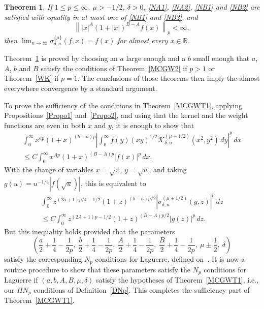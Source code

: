 \documentclass{amsart}
\theoremstyle{plain}
\newtheorem{Theo}{Theorem}
\theoremstyle{definition}
\theoremstyle{remark}
\newcommand{\chem}[3]{\sigma_{#1,#2}^{\{#3\}}} %
\newcommand{\claker}[5]{\mathcal{K}_{#1,#2}^{(#3)}%
  (#4,#5)} %
\newcommand{\clam}[3]{\sigma_{#1,#2}^{(#3)}} %
\newcommand{\I}{\infty}
\begin{document}
\begin{Theo}
\label{CAE} If $1\le p\le\infty$, $\mu>-1/2$, $\delta>0$, \eqref{NA1}, \eqref{NA2}, \eqref{NB1}
and \eqref{NB2} are satisfied with equality in at most one of \eqref{NB1} and \eqref{NB2}, and
\[
  \left\| |x|^A(1+|x|)^{B-A}f(x)\right\|_p < \infty,
\]
then
$\displaystyle{\lim_{n\to\infty}\chem{\delta}{n}{\mu}(f,x)=f(x)}$
for almost every $x \in \mathbb{R}$.
\end{Theo}

Theorem~\ref{CAE} is proved by choosing an $a$ large enough and a $b$ small enough that $a$, $A$,
$b$ and $B$ satisfy the conditions of Theorem~\ref{MCGW2} if $p>1$ or Theorem~\ref{WK} if $p=1$.
The conclusions of those theorems then imply the almost everywhere convergence by a standard
argument.

To prove the sufficiency of the conditions in Theorem~\ref{MCGWT1}, applying
Propositions~\ref{Propo1} and~\ref{Propo2}, and using that the kernel and the weight
functions are even in both $x$ and $y$, it is enough to show that
\begin{multline*}
  \int_0^\I x^{ap}(1+x)^{(b-a)p} \left|\int_0^\I f(y)(xy)^{1/2}
    \claker{\delta}{n}{\mu\pm 1/2}{x^2}{y^2}\,dy\right|^p\,dx \\
  \le C \int_0^\I x^{Ap}(1+x)^{(B-A)p}|f(x)|^p\,dx.
\end{multline*}
With the change of variables $x=\sqrt{z}$, $y=\sqrt{u}$, and taking
$g(u) = u^{-1/4}|f(\sqrt{u})|$, this is equivalent to
\begin{multline*}
  \int_0^{\I}z^{(2a+1)p/4-1/2}(1+z)^{(b-a)p/2}|
    \clam{\delta}{n}{\mu\pm 1/2}(g,z)|^p\,dz \\
  \le C \int_0^\I z^{(2A+1)p-1/2}(1+z)^{(B-A)p/2}|g(z)|^p\,dz.
\end{multline*}
But this inequality holds provided that the parameters
\begin{equation}
\label{prm}
  \left( \frac{a}{2}+\frac{1}{4}-\frac{1}{2p},
  \ \frac{b}{2}+\frac{1}{4}-\frac{1}{2p},
  \ \frac{A}{2}+\frac{1}{4}-\frac{1}{2p},
  \ \frac{B}{2}+\frac{1}{4}-\frac{1}{2p},
  \ \mu\pm\frac{1}{2},\ \delta \right)
\end{equation}
satisfy the corresponding $N_p$ conditions for Laguerre, defined on~\cite[p.~1125--1126]{MW}. It
is now a routine procedure to show that these parameters satisfy the $N_p$ conditions for Laguerre
if $(a,b,A,B,\mu,\delta)$ satisfy the hypotheses of Theorem~\ref{MCGWT1}, i.e., our $H\!N_p$
conditions of Definition~\ref{DNp}. This completes the sufficiency part of Theorem~\ref{MCGWT1}.
\end{document}
